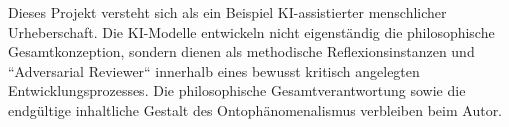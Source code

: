 Dieses Projekt versteht sich als ein Beispiel KI-assistierter menschlicher
Urheberschaft. Die KI-Modelle entwickeln nicht eigenständig die philosophische
Gesamtkonzeption, sondern dienen als methodische Reflexionsinstanzen und
``Adversarial Reviewer`` innerhalb eines bewusst kritisch angelegten
Entwicklungsprozesses. Die philosophische Gesamtverantwortung sowie die endgültige
inhaltliche Gestalt des Ontophänomenalismus verbleiben beim Autor.

